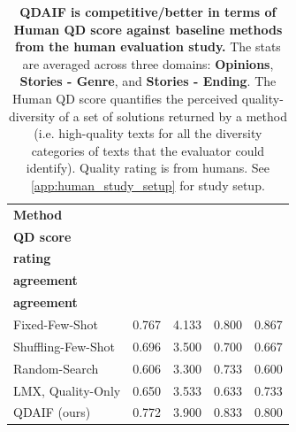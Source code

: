 \begin{table}[!t]
\caption{\textbf{QDAIF is competitive/better in terms of Human QD score against baseline methods from the human evaluation study.} The stats are averaged across three domains: \textbf{Opinions}, \textbf{Stories - Genre}, and \textbf{Stories - Ending}. The Human QD score quantifies the perceived quality-diversity of a set of solutions returned by a method (i.e. high-quality texts for all the diversity categories of texts that the evaluator could identify). Quality rating is from humans. See \cref{app:human_study_setup} for study setup.}
\label{table:mean_human_eval_baselines_vs_aif}
\centering
\small
\begin{tabular}{@{}lcccc@{}}
\toprule
\textbf{Method} &
\makecell[c]{\textbf{Human}\\\textbf{QD score}} & 
\makecell[c]{\textbf{Quality}\\\textbf{rating}} &
\makecell[c]{\textbf{Human-AI}\\\textbf{agreement}} & 
\makecell[c]{\textbf{Human}\\\textbf{agreement}}  \\
\midrule
Fixed-Few-Shot & 0.767 & 4.133 & 0.800 & 0.867  \\ 
Shuffling-Few-Shot & 0.696 & 3.500 & 0.700 & 0.667  \\ 
Random-Search & 0.606 & 3.300 & 0.733 & 0.600  \\ 
LMX, Quality-Only & 0.650 & 3.533 & 0.633 & 0.733  \\ 
QDAIF (ours) & 0.772 & 3.900 & 0.833 & 0.800  \\
\bottomrule
\end{tabular}
\end{table}

